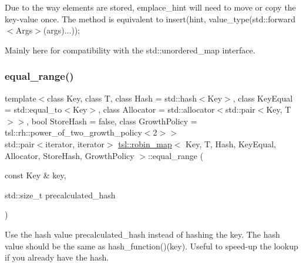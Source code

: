 Due to the way elements are stored, emplace\+\_\+hint will need to move or copy the key-\/value once. The method is equivalent to insert(hint, value\+\_\+type(std\+::forward$<$\+Args$>$(args)...));

Mainly here for compatibility with the std\+::unordered\+\_\+map interface. \mbox{\label{classtsl_1_1robin__map_a45f4347099fa07f978f5deda43c3d71e}} 
\subsubsection{\texorpdfstring{equal\_range()}{equal\_range()}\hspace{0.1cm}{\footnotesize\ttfamily [1/6]}}
{\footnotesize\ttfamily template$<$class Key, class T, class Hash = std\+::hash$<$\+Key$>$, class Key\+Equal = std\+::equal\+\_\+to$<$\+Key$>$, class Allocator = std\+::allocator$<$std\+::pair$<$\+Key, T$>$$>$, bool Store\+Hash = false, class Growth\+Policy = tsl\+::rh\+::power\+\_\+of\+\_\+two\+\_\+growth\+\_\+policy$<$2$>$$>$ \\
std\+::pair$<$iterator, iterator$>$ \mbox{\hyperlink{classtsl_1_1robin__map}{tsl\+::robin\+\_\+map}}$<$ Key, T, Hash, Key\+Equal, Allocator, Store\+Hash, Growth\+Policy $>$\+::equal\+\_\+range (\begin{DoxyParamCaption}\item[{const Key \&}]{key,  }\item[{std\+::size\+\_\+t}]{precalculated\+\_\+hash }\end{DoxyParamCaption})\hspace{0.3cm}{\ttfamily [inline]}}

Use the hash value \textquotesingle{}precalculated\+\_\+hash\textquotesingle{} instead of hashing the key. The hash value should be the same as hash\+\_\+function()(key). Useful to speed-\/up the lookup if you already have the hash. \mbox{\label{classtsl_1_1robin__map_a838ba4ebaedcbb3a250af31e80344f32}} 
